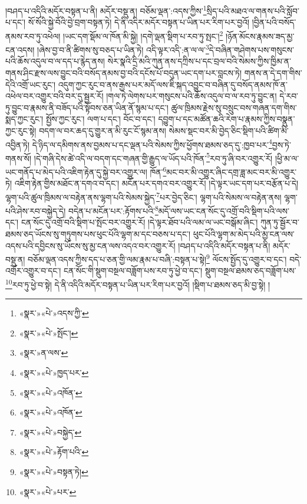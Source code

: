 །བཤད་པ་འདིའི་མདོར་བསྟན་པ་ནི། མདོར་བསྡུ་ན། བཅོམ་ལྡན་:འདས་ཀྱིས་\footnote{«སྣར་»«པེ་»འདས་ཀྱི་}སྲིད་པའི་མཐའ་ལ་གནས་པའི་སློབ་པ་དང་། སོ་སོའི་སྐྱེ་བོའི་བྱེ་བྲག་བསྟན་ཏེ། དེ་ནི་འདིར་མདོར་བསྟན་པ་ཡིན་པར་རིག་པར་བྱའོ། །བྱིན་པའི་བསོད་ནམས་རབ་ཏུ་འཕེལ། །ཡང་དག་སྡོམ་ལ་ཁོན་མི་སྐྱེ། །དགེ་ལྡན་སྡིག་པ་རབ་ཏུ་སྤང་།\footnote{«སྣར་»«པེ་»སྤོང་།} །ཉོན་མོངས་རྣམས་ཟད་མྱ་ངན་འདས། །ཞེས་བྱ་བ་ནི་ཚིགས་སུ་བཅད་པ་ཡིན་ཏེ། འདི་ལྟར་འདི་:ན་ལ་ལ་\footnote{«སྣར་»ན་ལས་}དེ་བཞིན་གཤེགས་པས་གསུངས་པའི་ཆོས་འདུལ་བ་ལ་དད་པ་རྙེད་ནས། སེར་སྣའི་དྲི་མའི་ཀུན་ནས་དཀྲིས་པ་དང་བྲལ་བའི་སེམས་ཀྱིས་ཁྱིམ་ན་གནས་ཤིང་རྫས་ལས་བྱུང་བའི་བསོད་ནམས་བྱ་བའི་དངོས་པོ་བདུན་ཡང་དག་པར་བླངས་ཏེ། གནས་ན་དེ་དག་གིས་དེའི་འགྲོ་ཡང་རུང་། འདུག་ཀྱང་རུང་བ་ནས་རྒྱས་པར་མདོ་ལས་ཇི་སྐད་འབྱུང་བ་བཞིན་དུ་བསོད་ནམས་ཁོ་ན་འཕེལ་བར་འགྱུར་བའི་བར་དུ་སྦྱར་རོ། །གལ་ཏེ་ལེགས་པར་གསུངས་པའི་ཆོས་འདུལ་བ་ལ་རབ་ཏུ་བྱུང་ན། དེ་རབ་ཏུ་བྱུང་བ་རྣམས་ནི་བཟོད་པའི་སྟོབས་ཅན་ཡིན་ནོ་སྙམ་པ་དང་། ཚུལ་ཁྲིམས་རྗེས་སུ་བསྲུང་བས་གཞན་དག་གིས་སྨད་ཀྱང་རུང་། སྤྱོས་ཀྱང་རུང་། ལག་པ་དང་། བོང་བ་དང་། དབྱུག་པ་དང་མཚོན་ཆའི་རེག་པ་རྣམས་ཀྱིས་བསྣུན་ཀྱང་རུང་སྟེ། བདག་ལ་བར་ཆད་དུ་གྱུར་ན་མི་རུང་ངོ་སྙམ་ནས། སེམས་སྡང་བར་མི་བྱེད་ཅིང་སྡིག་པའི་ཚིག་མི་འབྱིན་ཏེ། དེ་ཉིད་ལ་དམིགས་ནས་བྱམས་པ་དང་ལྡན་པའི་སེམས་ཀྱིས་ཕྱོགས་ཐམས་ཅད་དུ་:ཁྱབ་པར་\footnote{«སྣར་»«པེ་»ཁྱད་པར་}བྱས་ཏེ་གནས་སོ། །དེ་གཞི་དེས་ཚེ་འདི་ལ་བདག་དང་གཞན་གྱི་རྒྱུད་ལ་ཡོད་པའི་ཁོན་\footnote{«སྣར་»«པེ་»འཁོན་}རབ་ཏུ་ཞི་བར་འགྱུར་རོ། །ཕྱི་མ་ལ་ཡང་གནོད་པ་མེད་པའི་འཇིག་རྟེན་དུ་སྐྱེ་བར་འགྱུར་ལ། ཁོན་\footnote{«སྣར་»«པེ་»འཁོན་}མང་བར་མི་འགྱུར་ཞིང་དགྲ་ཟླ་མང་བར་མི་འགྱུར་ཏེ། འཇིག་རྟེན་གྱིས་མཐོང་ན་དགའ་བ་དང་། མངོན་པར་དགའ་བར་འགྱུར་རོ། །དེ་ལྟར་ཡང་དག་པར་བརྩོན་པ་དེ། ལྷག་པའི་ཚུལ་ཁྲིམས་ལ་བརྟེན་ནས་ལྷག་པའི་སེམས་སྐྱེད་\footnote{«སྣར་»«པེ་»བསྐྱེད་}པར་བྱེད་ཅིང་། ལྷག་པའི་སེམས་ལ་བརྟེན་ནས། ལྷག་པའི་ཤེས་རབ་བསྐྱེད་དེ། བདེན་པ་མངོན་པར་:རྟོགས་པའི་\footnote{«སྣར་»«པེ་»རྟོག་པའི་}མདོ་ལས་ཡང་ངན་སོང་དུ་འགྲོ་བའི་སྡིག་པའི་ལས་དང་། ངན་སོང་དུ་འགྲོ་བའི་སྡིག་པ་སྤོང་བར་འགྱུར་རོ། །དེ་ལྟར་ཐོབ་པའི་ལམ་ལ་ཡང་བསྒོམ་ཞིང་། ཀུན་ཏུ་སྦྱོར་བ་ཐམས་ཅད་ཡོངས་སུ་གཏུགས་པས་ཕུང་པོའི་ལྷག་མ་དང་བཅས་པ་དང་། ཕུང་པོའི་ལྷག་མ་མེད་པའི་མྱ་ངན་ལས་འདས་པའི་དབྱིངས་སུ་ཡོངས་སུ་མྱ་ངན་ལས་འདའ་བར་འགྱུར་རོ། །བཤད་པ་འདིའི་མདོར་བསྟན་པ་ནི། མདོར་བསྡུ་ན། བཅོམ་ལྡན་འདས་ཀྱིས་དད་པ་ཅན་གྱི་ལམ་རྣམ་པ་བཞི་:བསྟན་པ་སྟེ།\footnote{«སྣར་»«པེ་»བསྟན་ཏེ།} ལོངས་སྤྱོད་དུ་འགྱུར་བ་དང་། བདེ་འགྲོར་འགྱུར་བ་དང་། ངན་སོང་གི་སྡུག་བསྔལ་བཟློག་པས་རབ་ཏུ་ཕྱེ་བ་དང་། སྡུག་བསྔལ་ཐམས་ཅད་བཟློག་པས་\footnote{«སྣར་»«པེ་»པར་}རབ་ཏུ་ཕྱེ་བ་སྟེ། དེ་ནི་འདིའི་མདོར་བསྟན་པ་ཡིན་པར་རིག་པར་བྱའོ། །སྡིག་པ་ཐམས་ཅད་མི་བྱ་སྟེ། །
